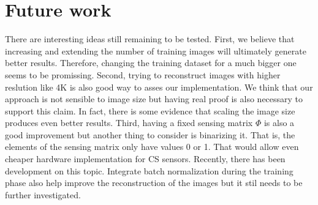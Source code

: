 \section{Future work}
There are interesting ideas still remaining to be tested. First, we believe that increasing and extending the number of training images will ultimately generate better results. Therefore, changing the training dataset for a much bigger one seems to be promissing. Second, trying to reconstruct images with higher reslution like 4K is also good way to asses our implementation. We think that our approach is not sensible to image size but having real proof is also necessary to support this claim. In fact, there is some evidence that scaling the image size produces even better results. Third, having a fixed sensing matrix $\Phi$ is also a good improvement but another thing to consider is binarizing it.  That is, the elements of the sensing matrix only have values 0 or 1. That would allow even cheaper hardware implementation for CS sensors. Recently, there has been development on this topic. Integrate batch normalization during the training phase also help improve the reconstruction of the images but it stil needs to be further investigated.




